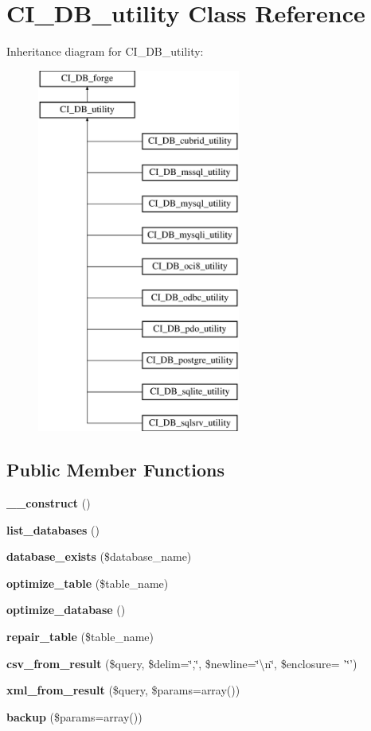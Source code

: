 \section{C\-I\-\_\-\-D\-B\-\_\-utility Class Reference}
\label{class_c_i___d_b__utility}
Inheritance diagram for C\-I\-\_\-\-D\-B\-\_\-utility\-:\begin{figure}[H]
\begin{center}
\leavevmode
\includegraphics[height=12.000000cm]{class_c_i___d_b__utility}
\end{center}
\end{figure}
\subsection*{Public Member Functions}
\begin{DoxyCompactItemize}
\item 
{\bf \-\_\-\-\_\-construct} ()
\item 
{\bf list\-\_\-databases} ()
\item 
{\bf database\-\_\-exists} (\$database\-\_\-name)
\item 
{\bf optimize\-\_\-table} (\$table\-\_\-name)
\item 
{\bf optimize\-\_\-database} ()
\item 
{\bf repair\-\_\-table} (\$table\-\_\-name)
\item 
{\bf csv\-\_\-from\-\_\-result} (\$query, \$delim=\char`\"{},\char`\"{}, \$newline=\char`\"{}\textbackslash{}n\char`\"{}, \$enclosure= '\char`\"{}') 
\item 
{\bf xml\-\_\-from\-\_\-result} (\$query, \$params=array())
\item 
{\bf backup} (\$params=array())
\end{DoxyCompactItemize}
